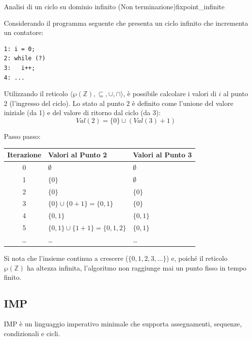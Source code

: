 \begin{esempio}{Analisi di un ciclo su dominio infinito (Non terminazione)}{fixpoint_infinite}

Considerando il programma seguente che presenta un ciclo infinito che
incrementa un contatore:

\begin{verbatim}
1: i = 0;
2: while (?)
3:   i++;
4: ...
\end{verbatim}

Utilizzando il reticolo $\langle \wp(\mathbb{Z}), \subseteq, \cup, \cap \rangle$,
è possibile calcolare i valori di $i$ al punto $2$ (l'ingresso del ciclo).
Lo stato al punto $2$ è definito come l'unione del valore iniziale (da 1) e
del valore di ritorno dal ciclo (da 3):
\[ Val(2) = \{0\} \cup (Val(3) + 1) \]

Passo passo:

\medskip

\begin{center}
\renewcommand{\arraystretch}{1.3}
\begin{tabular}{|c|l|l|}
  \hline
  \textbf{Iterazione} & \textbf{Valori al Punto 2} & \textbf{Valori al Punto 3} \\
  \hline
  \hline
  0 & $\emptyset$ & $\emptyset$ \\
  \hline
  1 & $\{0\}$ & $\emptyset$ \\
  \hline
  2 & $\{0\}$ & $\{0\}$ \\
  \hline
  3 & $\{0\} \cup \{0+1\} = \{0, 1\}$ & $\{0\}$ \\
  \hline
  4 & $\{0, 1\}$ & $\{0, 1\}$ \\
  \hline
  5 & $\{0, 1\} \cup \{1+1\} = \{0, 1, 2\}$ & $\{0, 1\}$ \\
  \hline
  \dots & \dots & \dots \\
  \hline
\end{tabular}
\end{center}

Si nota che l'insieme continua a crescere ($ \{0, 1, 2, 3, \dots\} $) e,
poiché il reticolo $\wp(\mathbb{Z})$ ha altezza infinita, l'algoritmo
non raggiunge mai un punto fisso in tempo finito.
\end{esempio}

\subsection{IMP}

IMP è un linguaggio imperativo minimale che supporta assegnamenti,
sequenze, condizionali e cicli.

